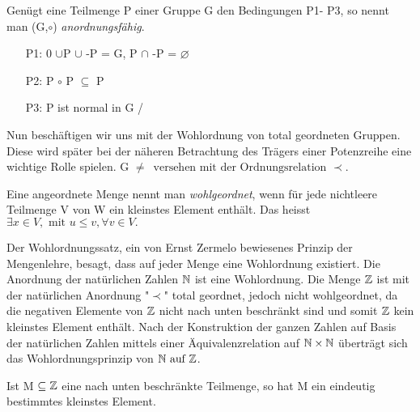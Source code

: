 %
%
%
\begin{defn}\label{afG}
%
Genügt eine Teilmenge P einer Gruppe G den Bedingungen P1- P3, so nennt man (G,$\circ $) \textit{anordnungsfähig}.
%
\begin{enumerate}
\item[P1:] {0} $\cup $P $\cup$ -P = G, P $\cap$ -P = $\varnothing$ 
\item[P2:] P $\circ$ P $\subseteq$ P
\item[P3:] P ist normal in G / %
\end{enumerate}
\end{defn}
%
%
Nun beschäftigen wir uns mit der Wohlordnung von total geordneten Gruppen. Diese wird später bei der näheren Betrachtung des Trägers einer Potenzreihe eine wichtige Rolle spielen.
G $\neq \, \text{ versehen mit der Ordnungsrelation }\prec$. 
\begin{defn} \label{wohlgeordn}
Eine angeordnete Menge nennt man \textit{wohlgeordnet}, wenn für jede nichtleere Teilmenge V von W ein kleinstes Element enthält. Das heisst $\exists x \in V, \text{ mit } u \le v, \forall v \in V.$ \cite{fuchs66} 
\end{defn}
%
Der Wohlordnungssatz, ein von Ernst Zermelo bewiesenes Prinzip der Mengenlehre, besagt, dass auf jeder Menge eine Wohlordnung existiert. Die Anordnung der natürlichen Zahlen $ \mathbb{N}$ ist eine Wohlordnung. Die Menge $\mathbb{Z}$ ist mit der natürlichen Anordnung "$\prec$" total geordnet, jedoch nicht wohlgeordnet, da die negativen Elemente von $\mathbb{Z}$ nicht nach unten beschränkt sind und somit $\mathbb{Z}$ kein kleinstes Element enthält. Nach der Konstruktion der ganzen Zahlen auf Basis der natürlichen Zahlen mittels einer Äquivalenzrelation auf $\mathbb{N} \times \mathbb{N}$  überträgt sich das Wohlordnungsprinzip von $\mathbb{N} \text{ auf } \mathbb{Z}$.
\begin{lemma}
Ist M $ \subseteq \mathbb{Z}$ eine nach unten beschränkte Teilmenge, so hat M ein eindeutig bestimmtes kleinstes Element. \cite{rainer08}
\end{lemma} 

